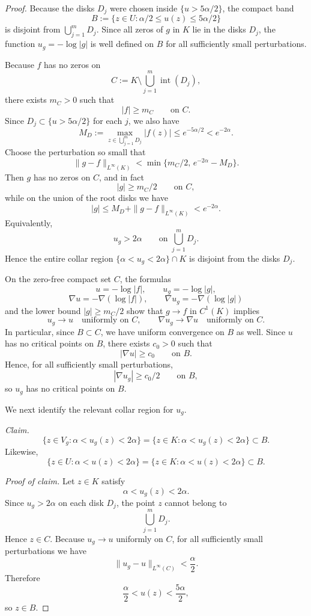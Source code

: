 \documentclass[12pt]{amsart}
\theoremstyle{definition}
\theoremstyle{remark}
\begin{document}
\begin{proof}
Because the disks $D_j$ were chosen inside $\{u>5\alpha/2\}$, the compact band
\[
B:=\{z\in U:\alpha/2\le u(z)\le 5\alpha/2\}
\]
is disjoint from $\bigcup_{j=1}^m D_j$. Since all zeros of $g$ in $K$ lie in the disks
$D_j$, the function $u_g=-\log|g|$ is well defined on $B$ for all sufficiently small
perturbations.

Because $f$ has no zeros on
\[
C:=K\setminus \bigcup_{j=1}^m \operatorname{int}(D_j),
\]
there exists $m_C>0$ such that
\[
|f|\ge m_C \qquad\text{on }C.
\]
Since $D_j\subset\{u>5\alpha/2\}$ for each $j$, we also have
\[
M_D:=\max_{z\in \bigcup_{j=1}^m D_j}|f(z)|\le e^{-5\alpha/2}<e^{-2\alpha}.
\]
Choose the perturbation so small that
\[
\|g-f\|_{L^\infty(K)}<\min\{m_C/2,\,e^{-2\alpha}-M_D\}.
\]
Then $g$ has no zeros on $C$, and in fact
\[
|g|\ge m_C/2 \qquad\text{on }C,
\]
while on the union of the root disks we have
\[
|g|\le M_D+\|g-f\|_{L^\infty(K)}<e^{-2\alpha}.
\]
Equivalently,
\[
u_g>2\alpha \qquad\text{on }\bigcup_{j=1}^m D_j.
\]
Hence the entire collar region $\{\alpha<u_g<2\alpha\}\cap K$ is disjoint from the disks $D_j$.

On the zero-free compact set $C$, the formulas
\[u=-\log|f|,\qquad u_g=-\log|g|,
\]
\[
\nabla u=-\nabla(\log|f|),\qquad \nabla u_g=-\nabla(\log|g|)
\]
and the lower bound $|g|\ge m_C/2$ show that $g\to f$ in $C^1(K)$ implies
\[u_g\to u \quad\text{uniformly on }C,
\qquad
\nabla u_g\to \nabla u \quad\text{uniformly on }C.
\]
In particular, since $B\subset C$, we have uniform convergence on $B$ as well. Since $u$
has no critical points on $B$, there exists $c_0>0$ such that
\[
|\nabla u|\ge c_0 \qquad\text{on }B.
\]
Hence, for all sufficiently small perturbations,
\[
|\nabla u_g|\ge c_0/2 \qquad\text{on }B,
\]
so $u_g$ has no critical points on $B$.

We next identify the relevant collar region for $u_g$.

\medskip
\noindent
\emph{Claim.}
\[
\{z\in V_g : \alpha<u_g(z)<2\alpha\}
=
\{z\in K : \alpha<u_g(z)<2\alpha\}
\subset B.
\]
Likewise,
\[
\{z\in U : \alpha<u(z)<2\alpha\}
=
\{z\in K : \alpha<u(z)<2\alpha\}
\subset B.
\]

\smallskip
\noindent
\emph{Proof of claim.}
Let $z\in K$ satisfy
\[
\alpha<u_g(z)<2\alpha.
\]
Since $u_g>2\alpha$ on each disk $D_j$, the point $z$ cannot belong to
\[
\bigcup_{j=1}^m D_j.
\]
Hence $z\in C$. Because $u_g\to u$ uniformly on $C$, for all sufficiently small
perturbations we have
\[
\|u_g-u\|_{L^\infty(C)}<\frac{\alpha}{2}.
\]
Therefore
\[
\frac{\alpha}{2}<u(z)<\frac{5\alpha}{2},
\]
so $z\in B$.


\end{proof}
\end{document}
